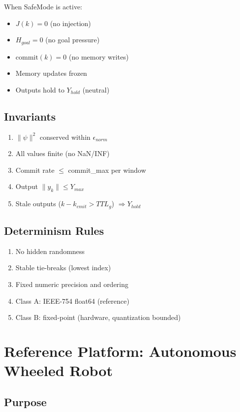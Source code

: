 \documentclass[11pt, a4paper]{report}
\begin{document}
When SafeMode is active:
\begin{itemize}[nosep]
  \item $J(k) = 0$ (no injection)
  \item $H_{goal} = 0$ (no goal pressure)
  \item $\text{commit}(k) = 0$ (no memory writes)
  \item Memory updates frozen
  \item Outputs hold to $Y_{hold}$ (neutral)
\end{itemize}

\section{Invariants}

\begin{enumerate}[nosep]
  \item $\|\psi\|^2$ conserved within $\epsilon_{norm}$
  \item All values finite (no NaN/INF)
  \item Commit rate $\leq$ commit\_max per window
  \item Output $\|y_k\| \leq Y_{max}$
  \item Stale outputs ($k - k_{emit} > TTL_g$) $\Rightarrow Y_{hold}$
\end{enumerate}

\section{Determinism Rules}

\begin{enumerate}[nosep]
  \item No hidden randomness
  \item Stable tie-breaks (lowest index)
  \item Fixed numeric precision and ordering
  \item Class A: IEEE-754 float64 (reference)
  \item Class B: fixed-point (hardware, quantization bounded)
\end{enumerate}

\chapter{Reference Platform: Autonomous Wheeled Robot}

\section{Purpose}
\end{document}

